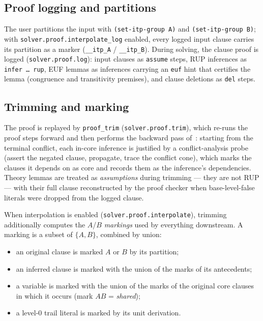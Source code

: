 \documentclass[11pt]{article}
\newcommand{\opt}[1]{\texttt{#1}}
\newcommand{\code}[1]{\texttt{#1}}
\begin{document}
\subsection{Proof logging and partitions}

The user partitions the input with \code{(set-itp-group A)} and
\code{(set-itp-group B)}; with \opt{solver.proof.interpolate\_log} enabled,
every logged input clause carries its partition as a marker
(\code{\_\_itp\_A} / \code{\_\_itp\_B}). During solving, the clause proof is
logged (\opt{solver.proof.log}): input clauses as \code{assume} steps, RUP
inferences as \code{infer \ldots\ rup}, EUF lemmas as inferences carrying an
\code{euf} hint that certifies the lemma (congruence and transitivity
premises), and clause deletions as \code{del} steps.

\subsection{Trimming and marking}

The proof is replayed by \code{proof\_trim}
(\opt{solver.proof.trim}), which re-runs the proof steps forward and then
performs the backward pass of~\cite{drup-itp}: starting from the terminal
conflict, each in-core inference is justified by a conflict-analysis probe
(assert the negated clause, propagate, trace the conflict cone), which marks
the clauses it depends on as core and records them as the inference's
dependencies. Theory lemmas are treated as \emph{assumptions} during
trimming --- they are not RUP --- with their full clause reconstructed by the
proof checker when base-level-false literals were dropped from the logged
clause.

When interpolation is enabled (\opt{solver.proof.interpolate}), trimming
additionally computes the $A$/$B$ \emph{markings} used by everything
downstream. A marking is a subset of $\{A, B\}$, combined by union:
\begin{itemize}
\item an original clause is marked $A$ or $B$ by its partition;
\item an inferred clause is marked with the union of the marks of its
      antecedents;
\item a variable is marked with the union of the marks of the original core
      clauses in which it occurs (mark $AB$ = \emph{shared});
\item a level-0 trail literal is marked by its unit derivation.
\end{itemize}
\end{document}
